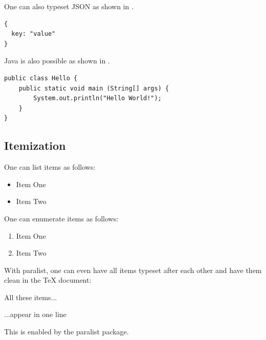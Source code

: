 One can also typeset JSON as shown in .

\begin{ltgexample}
\begin{listing}[htbp]
  \begin{verbatim}
{
  key: "value"
}
\end{verbatim}
  \caption{Example JSON listing using minted}
  \label{lst:flJSON}
\end{listing}
\end{ltgexample}

Java is also possible as shown in .

\begin{ltgexample}
\begin{listing}[htbp]
  \begin{verbatim}
public class Hello {
    public static void main (String[] args) {
        System.out.println("Hello World!");
    }
}
\end{verbatim}
  \caption{Java code rendered using minted}
  \label{lst:flJava}
\end{listing}
\end{ltgexample}

\subsection{Itemization}

One can list items as follows:

\begin{ltgexample}
\begin{itemize}
  \item Item One
  \item Item Two
\end{itemize}
\end{ltgexample}


One can enumerate items as follows:

\begin{ltgexample}
\begin{enumerate}
  \item Item One
  \item Item Two
\end{enumerate}
\end{ltgexample}


With paralist, one can even have all items typeset after each other and have them clean in the TeX document:

\begin{ltgexample}
\begin{inparaenum}
  \item All these items...
  \item ...appear in one line
  \item This is enabled by the paralist package.
\end{inparaenum}
\end{ltgexample}

